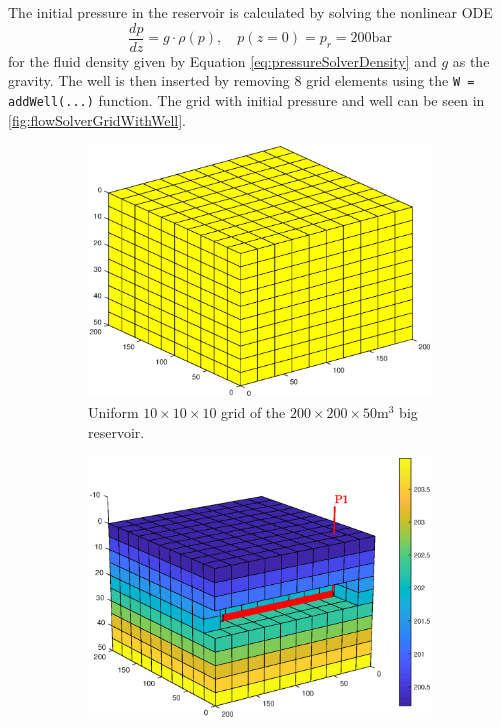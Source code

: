The initial pressure in the reservoir is calculated by solving the nonlinear ODE
\begin{equation*}
    \frac{dp}{dz} = g\cdot \rho(p), \quad p(z = 0) = p_r = 200\text{bar} 
\end{equation*}  
for the fluid density given by Equation \eqref{eq:pressureSolverDensity} and $g$ as the gravity. The well is then inserted by removing 8 grid elements using the \texttt{W = addWell(...)} function. The grid with initial pressure and well can be seen in \autoref{fig:flowSolverGridWithWell}.
\begin{figure}[H]
    \centering
    \begin{subfigure}[t]{0.48\textwidth}
        \centering
        \includegraphics[width = \textwidth]{figures/flowSolver_grid.eps}
        \caption{Uniform $10\times 10 \times 10$ grid of the $200\times 200 \times 50 \text{m}^3$ big reservoir.}
        \label{fig:flowSolverGrid}
    \end{subfigure}
    \hfill
    \begin{subfigure}[t]{0.48\textwidth}
        \centering
        \includegraphics[width = \textwidth]{figures/flowSolver_gridWithWell.eps}

\end{subfigure}
\end{figure}
